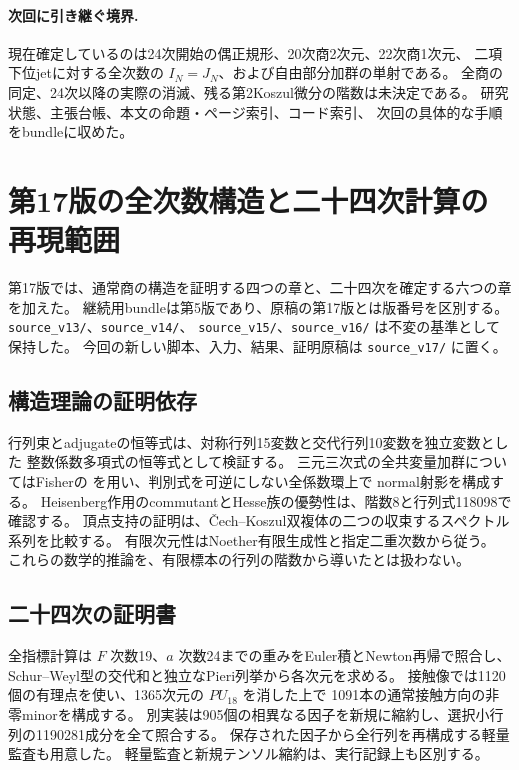 \documentclass[a4paper,11pt]{ltjsarticle}
\theoremstyle{definition}
\begin{document}
\paragraph{次回に引き継ぐ境界.}
現在確定しているのは24次開始の偶正規形、20次商2次元、22次商1次元、
二項下位jetに対する全次数の $I_N=J_N$、および自由部分加群の単射である。
全商の同定、24次以降の実際の消滅、残る第2Koszul微分の階数は未決定である。
研究状態、主張台帳、本文の命題・ページ索引、コード索引、
次回の具体的な手順をbundleに収めた。


\section{第17版の全次数構造と二十四次計算の再現範囲}
\label{app:v17-reproducibility}

第17版では、通常商の構造を証明する四つの章と、二十四次を確定する六つの章を加えた。
継続用bundleは第5版であり、原稿の第17版とは版番号を区別する。
\nolinkurl{source_v13/}、\nolinkurl{source_v14/}、
\nolinkurl{source_v15/}、\nolinkurl{source_v16/} は不変の基準として保持した。
今回の新しい脚本、入力、結果、証明原稿は \nolinkurl{source_v17/} に置く。

\subsection{構造理論の証明依存}

行列束とadjugateの恒等式は、対称行列15変数と交代行列10変数を独立変数とした
整数係数多項式の恒等式として検証する。
三元三次式の全共変量加群についてはFisherの
\cite[Theorem~2.7(i)]{FisherHessian2012}を用い、判別式を可逆にしない全係数環上で
normal射影を構成する。
Heisenberg作用のcommutantとHesse族の優勢性は、階数8と行列式118098で確認する。
頂点支持の証明は、\v{C}ech--Koszul双複体の二つの収束するスペクトル系列を比較する。
有限次元性はNoether有限生成性と指定二重次数から従う。
これらの数学的推論を、有限標本の行列の階数から導いたとは扱わない。

\subsection{二十四次の証明書}

全指標計算は $F$ 次数19、$a$ 次数24までの重みをEuler積とNewton再帰で照合し、
Schur--Weyl型の交代和と独立なPieri列挙から各次元を求める。
接触像では1120個の有理点を使い、1365次元の $PU_{18}$ を消した上で
1091本の通常接触方向の非零minorを構成する。
別実装は905個の相異なる因子を新規に縮約し、選択小行列の1190281成分を全て照合する。
保存された因子から全行列を再構成する軽量監査も用意した。
軽量監査と新規テンソル縮約は、実行記録上も区別する。
\end{document}
